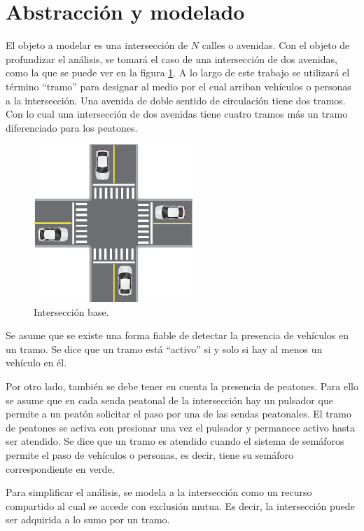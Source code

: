 \lstset {
	columns=flexible,
	tabsize=4
}

\section{Abstracción y modelado}
El objeto a modelar es una intersección de $N$ calles o avenidas. Con el objeto de profundizar el análisis, se tomará el caso de una intersección de dos avenidas, como la que se puede ver en la figura \ref{fig:interseccion-base}. A lo largo de este trabajo se utilizará el término \enquote{tramo} para designar al medio por el cual arriban vehículos o personas a la intersección. Una avenida de doble sentido de circulación tiene dos tramos. Con lo cual una intersección de dos avenidas tiene cuatro tramos más un tramo diferenciado para los peatones.

\begin{figure}[htbp]
	\centering
	\includegraphics[width=6cm]{imagenes/interseccion-base.eps}
	\caption{Intersección base.}
	\label{fig:interseccion-base}
\end{figure}

Se asume que se existe una forma fiable de detectar la presencia de vehículos en un tramo. Se dice que un tramo está \enquote{activo} si y solo si hay al menos un vehículo en él.

Por otro lado, también se debe tener en cuenta la presencia de peatones. Para ello se asume que en cada senda peatonal de la intersección hay un pulsador que permite a un peatón solicitar el paso por una de las sendas peatonales. El tramo de peatones se activa con presionar una vez el pulsador y permanece activo hasta ser atendido. Se dice que un tramo es atendido cuando el sistema de semáforos permite el paso de vehículos o personas, es decir, tiene su semáforo correspondiente en verde.

Para simplificar el análisis, se modela a la intersección como un recurso compartido al cual se accede con exclusión mutua. Es decir, la intersección puede ser adquirida a lo sumo por un tramo.

